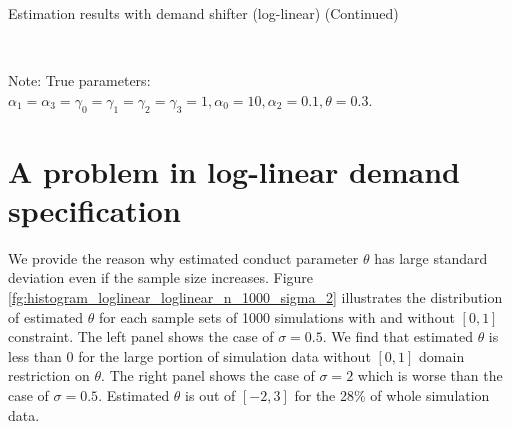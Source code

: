 \documentclass[11pt, a4paper]{article}
\begin{document}
\begin{table}[!htbp]
  \ContinuedFloat  %
  \begin{center}
      \caption{Estimation results with demand shifter (log-linear) (Continued)}
      \label{tb:loglinear_loglinear_sigma_1} 
      \subfloat[$\sigma=1.0$]{}\\
    \subfloat[$\sigma=2.0$]{}
  \end{center}\footnotesize
  Note: True parameters: $\alpha_1 = \alpha_3 = \gamma_0 = \gamma_1 = \gamma_2  = \gamma_3 = 1, \alpha_0 = 10, \alpha_2 = 0.1,  \theta = 0.3.$
\end{table} 


\section{A problem in log-linear demand specification}

We provide the reason why estimated conduct parameter $\theta$ has large standard deviation even if the sample size increases. Figure \ref{fg:histogram_loglinear_loglinear_n_1000_sigma_2} illustrates the distribution of estimated $\theta$ for each sample sets of 1000 simulations with and without $[0,1]$ constraint. The left panel shows the case of $\sigma=0.5$. We find that estimated $\theta$ is less than 0 for the large portion of simulation data without $[0,1]$ domain restriction on $\theta$. The right panel shows the case of $\sigma=2$ which is worse than the case of $\sigma=0.5$. Estimated $\theta$ is out of $[-2,3]$ for the 28\% of whole simulation data. 
\end{document}
